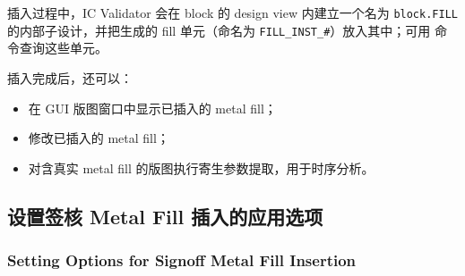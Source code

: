插入过程中，IC Validator 会在 block 的 design view 内建立一个名为 \texttt{block.FILL} 的内部子设计，并把生成的 fill 单元（命名为 \texttt{FILL\_INST\_\#}）放入其中；可用  命令查询这些单元。

插入完成后，还可以：
\begin{itemize}
  \item 在 GUI 版图窗口中显示已插入的 metal fill；
  \item 修改已插入的 metal fill；
  \item 对含真实 metal fill 的版图执行寄生参数提取，用于时序分析。
\end{itemize}

\subsection{设置签核 Metal Fill 插入的应用选项}
\subsubsection*{Setting Options for Signoff Metal Fill Insertion}

